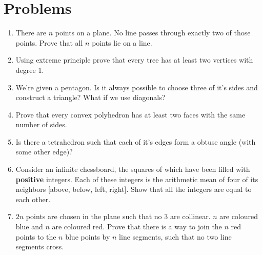 \documentclass[12pt]{article}
\begin{document}
\section{Problems}

\begin{enumerate}

	\item{There are $n$ points on a plane. No line passes through exactly two of those points. Prove that all $n$ points lie on a line.}

	\item{Using extreme principle prove that every tree has at least two vertices with degree 1.}
	
	\item{We're given a pentagon. Is it always possible to choose three of it's sides and construct a triangle? What if we use diagonals?}
	
	\item{Prove that every convex polyhedron has at least two faces with the same number of sides.}
	
	\item{Is there a tetrahedron such that each of it's edges form a obtuse angle (with some other edge)?}
	
	\item{Consider an infinite chessboard, the squares of which have been filled with \textbf{positive} integers. Each of these integers is the arithmetic mean of four of its neighbors [above, below, left, right]. Show that all the integers are equal to each other.}
	
	\item{$2n$ points are chosen in the plane such that no $3$ are collinear. $n$ are coloured blue and $n$ are coloured red. Prove that there is a way to join the $n$ red points to the $n$ blue points by $n$ line segments, such that no two line segments cross.}
	
	
	

\end{enumerate}
\end{document}
